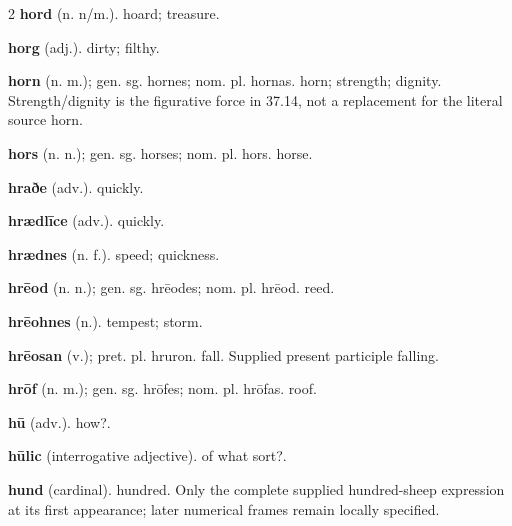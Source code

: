 \begin{multicols*}{2}
\textbf{hord} (n. n/m.). hoard; treasure.\par
\textbf{horg} (adj.). dirty; filthy.\par
\textbf{horn} (n. m.); gen. sg. hornes; nom. pl. hornas. horn; strength; dignity. Strength/dignity is the figurative force in 37.14, not a replacement for the literal source horn.\par
\textbf{hors} (n. n.); gen. sg. horses; nom. pl. hors. horse.\par
\textbf{hraðe} (adv.). quickly.\par
\textbf{hrædlīce} (adv.). quickly.\par
\textbf{hrædnes} (n. f.). speed; quickness.\par
\textbf{hrēod} (n. n.); gen. sg. hrēodes; nom. pl. hrēod. reed.\par
\textbf{hrēohnes} (n.). tempest; storm.\par
\textbf{hrēosan} (v.); pret. pl. hruron. fall. Supplied present participle falling.\par
\textbf{hrōf} (n. m.); gen. sg. hrōfes; nom. pl. hrōfas. roof.\par
\textbf{hū} (adv.). how?.\par
\textbf{hūlic} (interrogative adjective). of what sort?.\par
\textbf{hund} (cardinal). hundred. Only the complete supplied hundred-sheep expression at its first appearance; later numerical frames remain locally specified.\par

\end{multicols*}
